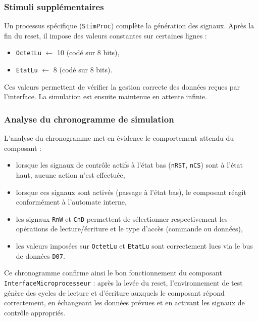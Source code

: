 \subsubsection{Stimuli supplémentaires}
Un processus spécifique (\texttt{StimProc}) complète la génération des signaux.  
Après la fin du reset, il impose des valeurs constantes sur certaines lignes :
\begin{itemize}
  \item \texttt{OctetLu} $\leftarrow$ 10 (codé sur 8 bits),
  \item \texttt{EtatLu} $\leftarrow$ 8 (codé sur 8 bits).
\end{itemize}
Ces valeurs permettent de vérifier la gestion correcte des données reçues par l’interface.  
La simulation est ensuite maintenue en attente infinie.

\subsubsection{Analyse du chronogramme de simulation}
L’analyse du chronogramme met en évidence le comportement attendu du composant :
\begin{itemize}
  \item lorsque les signaux de contrôle actifs à l’état bas (\texttt{nRST}, \texttt{nCS}) sont à l’état haut, aucune action n’est effectuée,
  \item lorsque ces signaux sont activés (passage à l’état bas), le composant réagit conformément à l’automate interne,
  \item les signaux \texttt{RnW} et \texttt{CnD} permettent de sélectionner respectivement les opérations de lecture/écriture et le type d’accès (commande ou données),
  \item les valeurs imposées sur \texttt{OctetLu} et \texttt{EtatLu} sont correctement lues via le bus de données \texttt{D07}.
\end{itemize}

Ce chronogramme confirme ainsi le bon fonctionnement du composant \texttt{InterfaceMicroprocesseur} :  
après la levée du reset, l’environnement de test génère des cycles de lecture et d’écriture auxquels le composant répond correctement, en échangeant les données prévues et en activant les signaux de contrôle appropriés.
